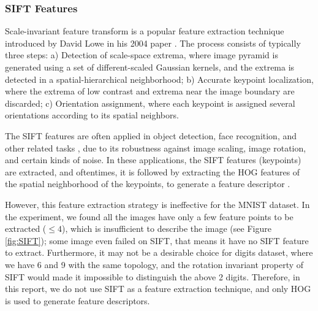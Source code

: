 \documentclass[12pt]{article}
\begin{document}
\subsubsection*{SIFT Features}
 
Scale-invariant feature transform is a popular feature extraction technique introduced by David Lowe in his 2004 paper \cite{lowe2004distinctive}. The process consists of typically three steps: a) Detection of scale-space extrema, where image pyramid is generated using a set of different-scaled Gaussian kernels, and the extrema is detected in a spatial-hierarchical neighborhood; b) Accurate keypoint localization, where the extrema of low contrast and extrema near the image boundary are discarded; c) Orientation assignment, where each keypoint is assigned several orientations according to its spatial neighbors.

The SIFT features are often applied in object detection, face recognition, and other related tasks \cite{yilmaz2006object, dalal2005histograms}, due to its robustness against image scaling, image rotation, and certain kinds of noise. In these applications, the SIFT features (keypoints) are extracted, and oftentimes, it is followed by extracting the HOG features of the spatial neighborhood of the keypoints, to generate a feature descriptor \cite{lowe2004distinctive}.

However, this feature extraction strategy is ineffective for the MNIST dataset. In the experiment, we found all the images have only a few feature points to be extracted ($\leq 4$), which is insufficient to describe the image (see Figure \ref{fig:SIFT}); some image even failed on SIFT, that means it have no SIFT feature to extract. Furthermore, it may not be a desirable choice for digits dataset, where we have 6 and 9 with the same topology, and the rotation invariant property of SIFT would made it impossible to distinguish the above 2 digits. Therefore, in this report, we do not use SIFT as a feature extraction technique, and only HOG is used to generate feature descriptors.
\end{document}
